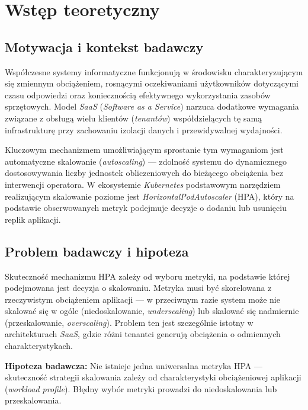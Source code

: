 \chapter{Wstęp teoretyczny}

\section{Motywacja i kontekst badawczy}

Współczesne systemy informatyczne funkcjonują w środowisku charakteryzującym się zmiennym obciążeniem, rosnącymi oczekiwaniami użytkowników dotyczącymi czasu odpowiedzi oraz koniecznością efektywnego wykorzystania zasobów sprzętowych. Model \textit{SaaS} (\textit{Software as a Service}) narzuca dodatkowe wymagania związane z obsługą wielu klientów (\textit{tenantów}) współdzielących tę samą infrastrukturę przy zachowaniu izolacji danych i przewidywalnej wydajności.

Kluczowym mechanizmem umożliwiającym sprostanie tym wymaganiom jest automatyczne skalowanie (\textit{autoscaling}) — zdolność systemu do dynamicznego dostosowywania liczby jednostek obliczeniowych do bieżącego obciążenia bez interwencji operatora. W ekosystemie \textit{Kubernetes} podstawowym narzędziem realizującym skalowanie poziome jest \textit{HorizontalPodAutoscaler} (HPA), który na podstawie obserwowanych metryk podejmuje decyzje o dodaniu lub usunięciu replik aplikacji.

\section{Problem badawczy i hipoteza}

Skuteczność mechanizmu HPA zależy od wyboru metryki, na podstawie której podejmowana jest decyzja o skalowaniu. Metryka musi być skorelowana z rzeczywistym obciążeniem aplikacji — w przeciwnym razie system może nie skalować się w ogóle (niedoskalowanie, \textit{underscaling}) lub skalować się nadmiernie (przeskalowanie, \textit{overscaling}). Problem ten jest szczególnie istotny w architekturach \textit{SaaS}, gdzie różni tenantci generują obciążenia o odmiennych charakterystykach.

\textbf{Hipoteza badawcza:} Nie istnieje jedna uniwersalna metryka HPA — skuteczność strategii skalowania zależy od charakterystyki obciążeniowej aplikacji (\textit{workload profile}). Błędny wybór metryki prowadzi do niedoskalowania lub przeskalowania.

